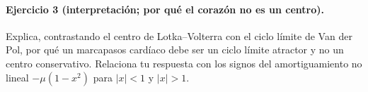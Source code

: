 \paragraph{Ejercicio 3 (interpretación; por qué el corazón no es un centro).} Explica, contrastando el centro de Lotka--Volterra con el ciclo límite de Van der Pol, por qué un marcapasos cardíaco debe ser un ciclo límite atractor y no un centro conservativo. Relaciona tu respuesta con los signos del amortiguamiento no lineal $-\mu(1-x^2)$ para $|x|<1$ y $|x|>1$.

